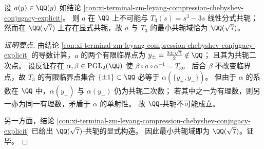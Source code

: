 \begin{conclusion}\label{con:xi-terminal-zm-leyang-compression-minimal-conjugacy-field}
设 \(a(y)\in\QQ(y)\) 如结论 \ref{con:xi-terminal-zm-leyang-compression-chebyshev-conjugacy-explicit}。
则 \(a\) 在 \(\QQ\) 上不可能与 \(T_{3}(s)=s^{3}-3s\) 线性分式共轭；
然而在 \(\QQ(\sqrt7)\) 上存在显式共轭，故 \(a\) 与 \(T_3\) 的最小共轭域恰为 \(\QQ(\sqrt7)\)。
\end{conclusion}
\begin{proof}[证明要点]
由结论 \ref{con:xi-terminal-zm-leyang-compression-chebyshev-conjugacy-explicit} 的导数计算，\(a\) 的两个有限临界点为
\(
y_{\pm}=\frac{3\pm\sqrt7}{2}
\notin\QQ
\)；
且其为共轭二次点。
设反证存在 \(\alpha,\beta\in\mathrm{PGL}_{2}(\QQ)\) 使 \(\beta\circ a\circ\alpha^{-1}=T_{3}\)。
后合 \(\beta\) 不改变临界点，故 \(T_{3}\) 的有限临界点集合 \(\{\pm 1\}\subset\QQ\) 必等于 \(\alpha(\{y_{+},y_{-}\})\)。
但由于 \(\alpha\) 的系数在 \(\QQ\) 中，\(\alpha(y_{+})\) 与 \(\alpha(y_{-})\) 仍为共轭二次数；
若其中之一为有理数，则另一亦为同一有理数，矛盾于 \(\alpha\) 的单射性。
故 \(\QQ\)-共轭不可能成立。
\par
另一方面，结论 \ref{con:xi-terminal-zm-leyang-compression-chebyshev-conjugacy-explicit} 已给出 \(\QQ(\sqrt7)\)-共轭的显式构造。
因此最小共轭域即为 \(\QQ(\sqrt7)\)。证毕。
\end{proof}

\endinput

